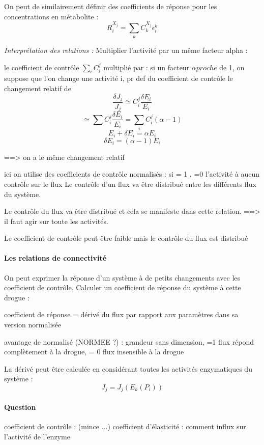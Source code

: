 On peut de similairement définir des coefficients de réponse pour les concentrations en métabolite :
$$ R_i^{X_j} = \sum_k C_k^{X_j} \epsilon_i^k $$


\textit{Interprétation des relations : }
Multiplier l'activité par un même facteur alpha :

le coefficient de contrôle $\sum_i C_i^j$  multiplié par :
 si un facteur $\alpha proche$ de 1, 
on suppose que l'on change une activité i, pr def du coefficient de contrôle le changement relatif de 
	$$\frac{\delta J_j}{J_j} \simeq C_i^j \frac{\delta E_i}{E_i}$$
	$$ \simeq \sum C_i^j \frac{\delta E_i}{E_i} = \sum _i C_i^j (\alpha - 1) $$
	$$ E_i + \delta E_i = \alpha E_i $$
	$$ \delta E_i = (\alpha -1 ) E_i $$
			 	
 	==> on a le même changement relatif
 	
 	ici on utilise des coefficients de contrôle normalisés : si = 1 , 
 	=0 l'activité à aucun contrôle sur le flux
 	Le contrôle d'un flux va être distribué entre les différents flux du système.
 	
 	Le contrôle du flux va être distribué et cela se manifeste dans cette relation. 
 	==> il faut agir sur toute les activités.
 	
 	Le coefficient de contrôle peut être faible mais le contrôle du flux est distribué
 	
 	


\paragraph{Les relations de connectivité}

On peut exprimer la réponse d'un système à de petits changements avec les coefficient de contrôle. 
Calculer un coefficient de réponse du système à cette drogue :

coefficient de réponse = dérivé du flux par rapport aux paramètres dans sa version normalisée

avantage de normalisé (NORMEE ?) : grandeur sans dimension, =1 flux répond complètement à la drogue, = 0 flux insensible à la drogue

La dérivé peut être calculée en considérant toutes les activités enzymatiques du système :
$$ J_j = J_j(E_k(P_i)) $$



\paragraph{Question} 
coefficient de contrôle :	(mince ...) 
coefficient d'élasticité : comment influx sur l'activité de l'enzyme

